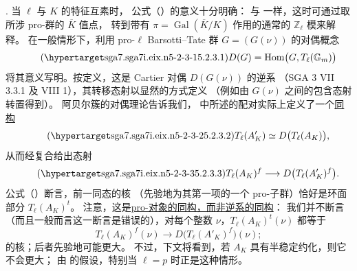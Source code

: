 \smallskip
\noindent
{}. 当 $\ell$ 与 $K$ 的特征互素时，
公式（）的意义十分明确：
与  一样，这时可通过取所涉 pro-群的 $\overline K$ 值点，
转到带有 $\pi=\operatorname{Gal}(\overline K/K)$ 作用的通常的 $\mathbb Z_\ell$ 模来解释。
在一般情形下，利用 pro-$\ell$ Barsotti--Tate 群 $G=(G(\nu))$ 的对偶概念
\begin{equation}\tag{\SGARefTarget{sga7.sga7i.eix.n5-2-3-1}{5.2.3.1}}
 D(G)=\operatorname{Hom}\bigl(G,T_\ell(\mathbb G_m)\bigr)
\end{equation}
将其意义写明。按定义，这是 Cartier 对偶 $D(G(\nu))$ 的逆系
（SGA 3 VII 3.3.1 及 VIII 1），其转移态射以显然的方式定义
（例如由 $G(\nu)$ 之间的包含态射转置得到）。
阿贝尔簇的对偶理论告诉我们， 中所述的配对实际上定义了一个\underline{同构}
\begin{equation}\tag{\SGARefTarget{sga7.sga7i.eix.n5-2-3-2}{5.2.3.2}}
 T_\ell(A'_K)\simeq D\bigl(T_\ell(A_K)\bigr),
\end{equation}
从而经复合给出态射
\begin{equation}\tag{\SGARefTarget{sga7.sga7i.eix.n5-2-3-3}{5.2.3.3}}
 T_\ell(A_K)^f\longrightarrow D\bigl(T_\ell(A'_K)^f\bigr).
\end{equation}
公式（）断言，前一同态的核
（先验地为其第一项的一个 pro-子群）恰好是环面部分 $T_\ell(A_K)^t$。
注意，这是\underline{pro-对象的同构，而非逆系的同构}：
我们并不断言（而且一般而言这一断言是错误的），对每个整数 $\nu$，$T_\ell(A_K)^t(\nu)$ 都等于
\[
 T_\ell(A_K)^f(\nu)
 \longrightarrow
 D\bigl(T_\ell(A'_K)^f\bigr)(\nu);
\]
的核；后者先验地可能更大。
不过，下文将看到，若 $A_K$ 具有半稳定约化，则它不会更大；
由  的假设，特别当 $\ell=p$ 时正是这种情形。


